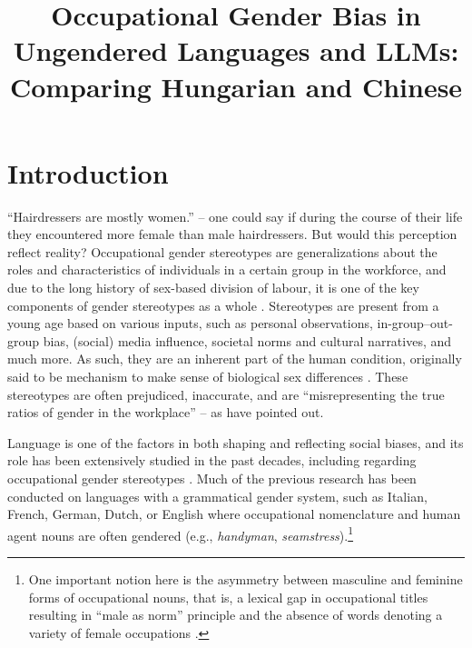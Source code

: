 \documentclass[10pt, a4paper]{article}
\title{Occupational Gender Bias in Ungendered Languages and LLMs: Comparing Hungarian and Chinese}
\begin{document}
\maketitleabstract

\section{Introduction}

``Hairdressers are mostly women.'' -- one could say if during the course of their life they encountered more female than male hairdressers. But would this perception reflect reality? 
Occupational gender stereotypes are generalizations about the roles and characteristics of individuals in a certain group in the workforce, and due to the long history of sex-based division of labour, it is one of the key components of gender stereotypes as a whole \citep{deaux_1984_structure}. Stereotypes are present from a young age \citep{canessapollard_2022_development} based on various inputs, such as personal observations, in-group--out-group bias, (social) media influence, societal norms and cultural narratives, and much more. As such, they are an inherent part of the human condition, originally said to be mechanism to make sense of biological sex differences \citep{levanon_2016_persistence}. These stereotypes are often prejudiced, inaccurate, and are ``misrepresenting the true ratios of gender in the workplace'' \citep{garnham_2015_true,gygax_2016_what} -- as \citet[][2]{kaukonen_2025_gender} have pointed out.

Language is one of the factors in both shaping and reflecting social biases, and its role has been extensively studied in the past decades, including regarding occupational gender stereotypes \citep[cf.][]{sabatini_1985_occupational,pauwels_1997_handymen,gygax_2008_generically,misersky_2014_norms,lewis_2020_gender,kaukonen_2025_gender}. Much of the previous research has been conducted on languages with a grammatical gender system, such as Italian, French, German, Dutch, or English where occupational nomenclature and human agent nouns are often gendered (e.g., \textit{handyman}, \textit{seamstress}).\footnote{One important notion here is the asymmetry between masculine and feminine forms of occupational nouns, that is, a lexical gap in occupational titles resulting in ``male as norm'' principle and the absence of words denoting a variety of female occupations \citep{baron_1986_grammar,hellinger_1990_kontrastive,sabatini_1985_occupational,yaguello_1978_mots,pauwels_2003_linguistic,lassonde_2013_occupational}.} 

\end{document}
